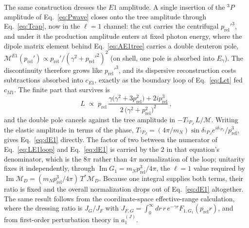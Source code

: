 \documentclass[
  aps,prd,twocolumn,nofootinbib,superscriptaddress,
  longbibliography,floatfix,preprintnumbers
]{revtex4-2}
\newcommand{\prel}{p_{\mathrm{rel}}}
\newcommand{\Egam}{E_{\gamma}}
\newcommand{\Mone}{M1}
\newcommand{\Eone}{E1}
\begin{document}
The same construction dresses the $\Eone$ amplitude. A single insertion of the
${}^{3}P$ amplitude of Eq.~\eqref{eq:Pwave} closes onto the tree amplitude
through Eq.~\eqref{eq:Tcap}, now in the $\ell=1$ channel: the cut carries the
centrifugal $\prel'^{3}$, and under it the production amplitude enters at
fixed photon energy, where the dipole matrix element behind
Eq.~\eqref{eq:AE1tree} carries a double deuteron pole,
$\mathcal{M}^{\Eone}(\prel')\propto\prel'/(\gamma^{2}+\prel'^{2})^{2}$
(on shell, one pole is absorbed into $\Egam$). The
discontinuity therefore grows like $\prel'^{3}$, and its dispersive
reconstruction costs subtractions absorbed into $c_{\Eone}$, exactly as the
boundary loop of Eq.~\eqref{eq:Lct} fed $c_{\Mone}$. The finite part that
survives is
\begin{equation}
  L \;\propto\; \prel\,
  \frac{\gamma\big(\gamma^{2}+3\prel^{2}\big)+2i\prel^{3}}
       {2\,\big(\gamma^{2}+\prel^{2}\big)^{2}}\,,
  \label{eq:LE1loop}
\end{equation}
and the double pole cancels against the tree amplitude in
$-T_{^{3}P_{J}}\,L/\mathcal{M}$.  Writing the elastic amplitude in terms of the
phase, $T_{^{3}P_{J}}=(4\pi/m_{N})\sin\delta_{^{3}P_{J}}e^{i\delta_{^{3}P_{J}}}/\prel^{3}$,
gives Eq.~\eqref{eq:dE1} directly.  The factor of two between the numerator of
Eq.~\eqref{eq:LE1loop} and Eq.~\eqref{eq:dE1} is carried by the $2$ in that
equation's denominator, which is the $8\pi$ rather than $4\pi$ normalization of the
loop; unitarity fixes it independently, through
$\operatorname{Im}G_{1}=m_{N}\prel^{3}/4\pi$, the $\ell=1$ value required by
$\operatorname{Im}\mathcal{M}_{D}=(m_{N}\prel^{3}/4\pi)\,T^{*}\mathcal{M}_{D}$.
Because one integral supplies both terms, their ratio is fixed and the overall
normalization drops out of Eq.~\eqref{eq:dE1} altogether.  The same result follows
from the coordinate-space effective-range calculation, where the dressing ratio is
$J_{G}/J_{F}$ with $J_{F,G}=\int_{0}^{\infty}\!dr\,r\,e^{-\gamma r}F_{1,G_{1}}(\prel r)$,
and from first-order perturbation theory in $a_{1}^{(J)}$.
\end{document}

